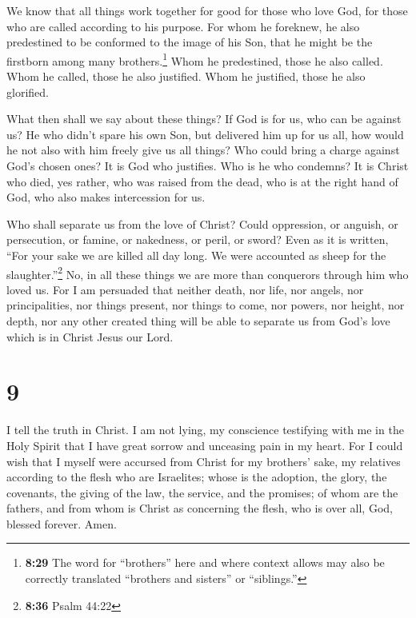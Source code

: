  We know that all things work together for good for those
who love God, for those who are called according to his purpose.
 For whom he foreknew, he also predestined to be
conformed to the image of his Son, that he might be the firstborn among
many brothers.\footnote{\textbf{8:29} The word for ``brothers'' here and
  where context allows may also be correctly translated ``brothers and
  sisters'' or ``siblings.''}  Whom he predestined, those
he also called. Whom he called, those he also justified. Whom he
justified, those he also glorified.

 What then shall we say about these things? If God is for
us, who can be against us?  He who didn't spare his own
Son, but delivered him up for us all, how would he not also with him
freely give us all things?  Who could bring a charge
against God's chosen ones? It is God who justifies.  Who
is he who condemns? It is Christ who died, yes rather, who was raised
from the dead, who is at the right hand of God, who also makes
intercession for us.

 Who shall separate us from the love of Christ? Could
oppression, or anguish, or persecution, or famine, or nakedness, or
peril, or sword?  Even as it is written, ``For your sake
we are killed all day long. We were accounted as sheep for the
slaughter.''\footnote{\textbf{8:36} Psalm 44:22}  No, in
all these things we are more than conquerors through him who loved us.
 For I am persuaded that neither death, nor life, nor
angels, nor principalities, nor things present, nor things to come, nor
powers,  nor height, nor depth, nor any other created
thing will be able to separate us from God's love which is in Christ
Jesus our Lord.

\hypertarget{section-8}{%
\section{9}\label{section-8}}

 I tell the truth in Christ. I am not lying, my conscience
testifying with me in the Holy Spirit  that I have great
sorrow and unceasing pain in my heart.  For I could wish
that I myself were accursed from Christ for my brothers' sake, my
relatives according to the flesh  who are Israelites;
whose is the adoption, the glory, the covenants, the giving of the law,
the service, and the promises;  of whom are the fathers,
and from whom is Christ as concerning the flesh, who is over all, God,
blessed forever. Amen.

